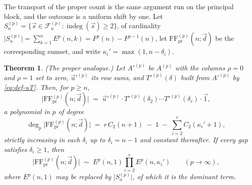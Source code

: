 \documentclass[11pt, a4paper, abstract=yes]{scrartcl}
\theoremstyle{definition}
\theoremstyle{remark}
\theoremstyle{plain}
\newtheorem{theorem}[definition]{Theorem}
\newcommand{\indeg}{\operatorname{indeg}}
\begin{document}
The transport of the proper count is the same argument run on the principal block, and the outcome
is a uniform shift by one. Let \(S_n^{(p)}=\lbrace\vec s\in\mathcal F_n^{(p)}:\indeg(\vec s)\ge2\rbrace\),
of cardinality
\(\lvert S_n^{(p)}\rvert=\sum_{k=1}^{n}E^p(n,k)=F^p(n)-F^{p-1}(n)\), let
\(\mathrm{FF}^{(p)}_{\mathrm{pr}}(n;\vec d)\) be the corresponding sumset, and write
\(\kappa_i'=\max(1,n-\delta_i)\).

\begin{theorem}
(\emph{The proper analogue.}) Let \(A'^{(p)}\) be \(A^{(p)}\) with the columns \(\rho=0\) and
\(\rho=1\) set to zero, \(\vec u'^{(p)}\) its row sums, and \(T'^{(p)}(\delta)\) built from
\(A'^{(p)}\) by \eqref{eq:def-uT}. Then, for \(p\ge n\),
\begin{equation}\label{eq:proper-p-product}
  \lvert\mathrm{FF}^{(p)}_{\mathrm{pr}}(n;\vec d)\rvert
  \;=\;\vec u'^{(p)}\cdot T'^{(p)}(\delta_2)\cdots T'^{(p)}(\delta_r)\cdot\vec 1 ,
\end{equation}
a polynomial in \(p\) of degree
\begin{equation}\label{eq:proper-degree-in-p}
  \deg_p\lvert\mathrm{FF}^{(p)}_{\mathrm{pr}}(n;\vec d)\rvert
   \;=\; r\,C_2(n+1)\;-\;1\;-\;\sum_{i=2}^{r}C_2(\kappa_i'+1),
\end{equation}
strictly increasing in each \(\delta_i\) up to \(\delta_i=n-1\) and constant thereafter. If every
gap satisfies \(\delta_i\ge1\), then
\begin{equation}\label{eq:proper-lc-in-p}
  \lvert\mathrm{FF}^{(p)}_{\mathrm{pr}}(n;\vec d)\rvert\;\sim\;E^p(n,1)\prod_{i=2}^{r}E^p(n,\kappa_i')
  \qquad(p\to\infty),
\end{equation}
where \(E^p(n,1)\) may be replaced by \(\lvert S_n^{(p)}\rvert\), of which it is the dominant term.
\label{thm-asymptotics-p-proper}
\end{theorem}
\end{document}
